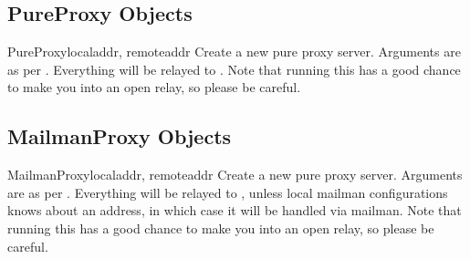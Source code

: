 \subsection{PureProxy Objects}

\begin{classdesc}{PureProxy}{localaddr, remoteaddr}
Create a new pure proxy server. Arguments are as per .
Everything will be relayed to .  Note that running
this has a good chance to make you into an open relay, so please be
careful.
\end{classdesc}


\subsection{MailmanProxy Objects}

\begin{classdesc}{MailmanProxy}{localaddr, remoteaddr}
Create a new pure proxy server. Arguments are as per
.  Everything will be relayed to ,
unless local mailman configurations knows about an address, in which
case it will be handled via mailman.  Note that running this has a
good chance to make you into an open relay, so please be careful.
\end{classdesc}
